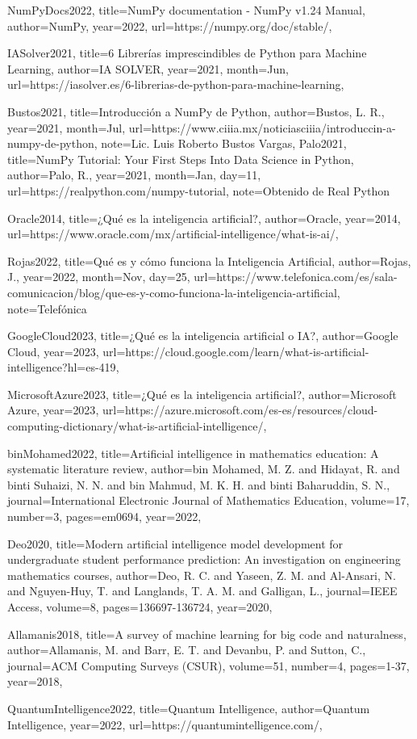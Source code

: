 \documentclass{article}
\theoremstyle{mytheoremstyle}
\theoremstyle{mytheoremstyle}
\theoremstyle{myproblemstyle}
\begin{document}
{NumPyDocs2022,
  title={NumPy documentation - NumPy v1.24 Manual},
  author={NumPy},
  year={2022},
  url={https://numpy.org/doc/stable/},
}

{IASolver2021,
  title={6 Librerías imprescindibles de Python para Machine Learning},
  author={IA SOLVER},
  year={2021},
  month={Jun},
  url={https://iasolver.es/6-librerias-de-python-para-machine-learning},
}

{Bustos2021,
  title={Introducción a NumPy de Python},
  author={Bustos, L. R.},
  year={2021},
  month={Jul},
  url={https://www.ciiia.mx/noticiasciiia/introduccin-a-numpy-de-python},
  note={Lic. Luis Roberto Bustos Vargas},
}
{Palo2021,
title={NumPy Tutorial: Your First Steps Into Data Science in Python},
author={Palo, R.},
year={2021},
month={Jan},
day={11},
url={https://realpython.com/numpy-tutorial},
note={Obtenido de Real Python}
}

{Oracle2014,
title={¿Qué es la inteligencia artificial?},
author={Oracle},
year={2014},
url={https://www.oracle.com/mx/artificial-intelligence/what-is-ai/},
}

{Rojas2022,
title={Qué es y cómo funciona la Inteligencia Artificial},
author={Rojas, J.},
year={2022},
month={Nov},
day={25},
url={https://www.telefonica.com/es/sala-comunicacion/blog/que-es-y-como-funciona-la-inteligencia-artificial},
note={Telefónica}
}

{GoogleCloud2023,
title={¿Qué es la inteligencia artificial o IA?},
author={Google Cloud},
year={2023},
url={https://cloud.google.com/learn/what-is-artificial-intelligence?hl=es-419},
}

{MicrosoftAzure2023,
title={¿Qué es la inteligencia artificial?},
author={Microsoft Azure},
year={2023},
url={https://azure.microsoft.com/es-es/resources/cloud-computing-dictionary/what-is-artificial-intelligence/},
}

{binMohamed2022,
title={Artificial intelligence in mathematics education: A systematic literature review},
author={bin Mohamed, M. Z. and Hidayat, R. and binti Suhaizi, N. N. and bin Mahmud, M. K. H. and binti Baharuddin, S. N.},
journal={International Electronic Journal of Mathematics Education},
volume={17},
number={3},
pages={em0694},
year={2022},
}

{Deo2020,
title={Modern artificial intelligence model development for undergraduate student performance prediction: An investigation on engineering mathematics courses},
author={Deo, R. C. and Yaseen, Z. M. and Al-Ansari, N. and Nguyen-Huy, T. and Langlands, T. A. M. and Galligan, L.},
journal={IEEE Access},
volume={8},
pages={136697-136724},
year={2020},
}

{Allamanis2018,
title={A survey of machine learning for big code and naturalness},
author={Allamanis, M. and Barr, E. T. and Devanbu, P. and Sutton, C.},
journal={ACM Computing Surveys (CSUR)},
volume={51},
number={4},
pages={1-37},
year={2018},
}

{QuantumIntelligence2022,
title={Quantum Intelligence},
author={Quantum Intelligence},
year={2022},
url={https://quantumintelligence.com/},
}
\end{document}
